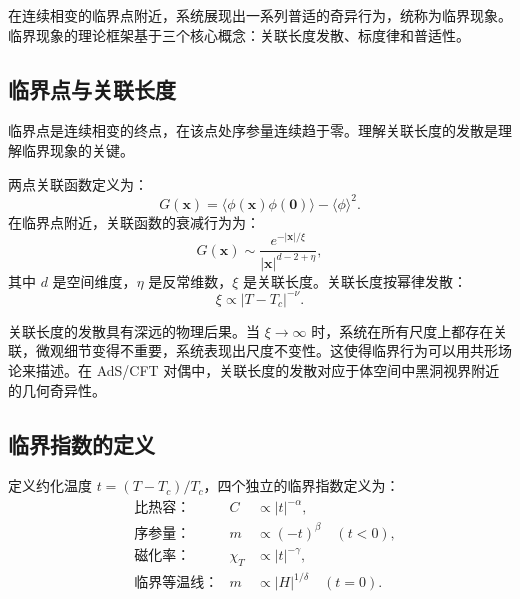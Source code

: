 在连续相变的临界点附近，系统展现出一系列普适的奇异行为，统称为临界现象。临界现象的理论框架基于三个核心概念：关联长度发散、标度律和普适性。

\subsection{临界点与关联长度}

\begin{note}
临界点是连续相变的终点，在该点处序参量连续趋于零。理解关联长度的发散是理解临界现象的关键。
\end{note}

\begin{definition}[关联函数与关联长度]
两点关联函数定义为：
\begin{equation}
    G(\mathbf{x}) = \langle \phi(\mathbf{x}) \phi(\mathbf{0}) \rangle - \langle \phi \rangle^2.
\end{equation}
在临界点附近，关联函数的衰减行为为：
\begin{equation}
    G(\mathbf{x}) \sim \frac{e^{-|\mathbf{x}|/\xi}}{|\mathbf{x}|^{d-2+\eta}},
\end{equation}
其中 $d$ 是空间维度，$\eta$ 是反常维数，$\xi$ 是关联长度。关联长度按幂律发散：
\begin{equation}
    \xi \propto |T - T_c|^{-\nu}.
\end{equation}
\end{definition}

\begin{remark}
关联长度的发散具有深远的物理后果。当 $\xi \to \infty$ 时，系统在所有尺度上都存在关联，微观细节变得不重要，系统表现出尺度不变性。这使得临界行为可以用共形场论来描述。在 AdS/CFT 对偶中，关联长度的发散对应于体空间中黑洞视界附近的几何奇异性。
\end{remark}

\subsection{临界指数的定义}

\begin{definition}[四个独立的临界指数]
定义约化温度 $t = (T - T_c)/T_c$，四个独立的临界指数定义为：
\begin{align}
    &\text{比热容：} & C &\propto |t|^{-\alpha}, \\
    &\text{序参量：} & m &\propto (-t)^{\beta} \quad (t < 0), \\
    &\text{磁化率：} & \chi_T &\propto |t|^{-\gamma}, \\
    &\text{临界等温线：} & m &\propto |H|^{1/\delta} \quad (t = 0).
\end{align}
\end{definition}

